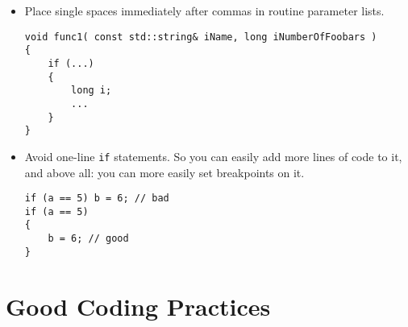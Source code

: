 \documentclass[10pt,a4paper,titlepage,dutch]{report}
\begin{document}
\begin{itemize}
\item Place single spaces immediately after commas in routine parameter
lists.

\verb|void func1( const std::string& iName, long iNumberOfFoobars )|\\
\verb|{|\\
\verb|    if (...)|\\
\verb|    {|\\
\verb|        long i;|\\
\verb|        ...|\\
\verb|    }|\\
\verb|}|

\item Avoid one-line \verb|if| statements.  So you can easily add more
lines of code to it, and above all: you can more easily set
breakpoints on it.

\verb|if (a == 5) b = 6; // bad|\\
\verb|if (a == 5)|\\
\verb|{|\\
\verb|    b = 6; // good|\\
\verb|}|

\end{itemize}



\chapter{Good Coding Practices}
\end{document}

